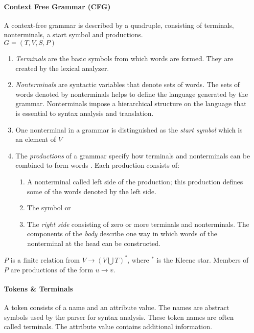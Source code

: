 \paragraph{Context Free Grammar (CFG)}
A context-free grammar is described by a quadruple, consisting of terminals, nonterminals, a start symbol and productions.\\
$G = (T, V, S, P)$
\begin{enumerate}
	\item \emph{Terminals} are the basic symbols from which words are formed.  They are created by the lexical analyzer.
	\item \emph{Nonterminals} are syntactic variables that denote sets of words. The sets of words denoted by nonterminals helps to define the language generated by the grammar. Nonterminals impose a hierarchical structure on the language that is essential to syntax analysis and translation.
	\item One nonterminal in a grammar is distinguished as the \emph{start symbol} which is an element of $V$
	\item The \emph{productions} of a grammar specify how terminals and nonterminals can be combined to form words . Each production consists of:
	\begin{enumerate}
		\item A nonterminal called left side of the production; this production defines some of the words denoted by the left side.
		\item The symbol \code{$\rightarrow$}  or  \code{::=} 
		\item The \emph{right side} consisting of zero or more terminals and nonterminals. The components of the \emph{body} describe one way in which words of the nonterminal at the head can be constructed.
	\end{enumerate}
\end{enumerate}
 $P$ is a finite relation from $V \rightarrow (V  \bigcup  T)^*$, where $^*$ is the Kleene star. Members of $P$ are productions of the form $u \rightarrow v$. \cite{DragonBook}


\paragraph{Tokens \& Terminals}  
A token consists of a name and an attribute value. The names are abstract symbols used by the parser for syntax analysis. These token names are often called terminals. The attribute value contains additional information. \cite{DragonBook}

